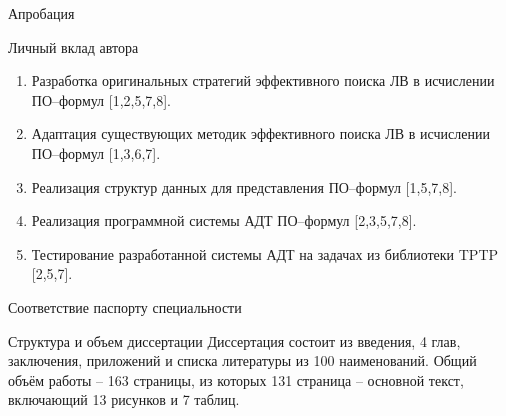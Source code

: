 \documentclass{beamer}
\begin{document}
\begin{frame}{Апробация}

\end{frame}


\begin{frame}{Личный вклад автора}
\begin{enumerate}
\item Разработка оригинальных стратегий эффективного поиска ЛВ в исчислении ПО--формул [1,2,5,7,8].
\item Адаптация существующих методик эффективного поиска ЛВ в исчислении ПО--формул [1,3,6,7].
\item Реализация структур данных для представления ПО--формул [1,5,7,8].
\item Реализация программной системы АДТ ПО--формул [2,3,5,7,8].
\item Тестирование разработанной системы АДТ на задачах из библиотеки TPTP [2,5,7].
\end{enumerate}
\end{frame}


\begin{frame}{Соответствие паспорту специальности}

\end{frame}


\begin{frame}{Структура и объем диссертации}
Диссертация состоит из введения, 4 глав, заключения, приложений и списка литературы из 100 наименований. Общий объём работы -- 163 страницы, из которых 131 страница -- основной текст, включающий 13 рисунков и 7 таблиц.
\end{frame}
\end{document}
